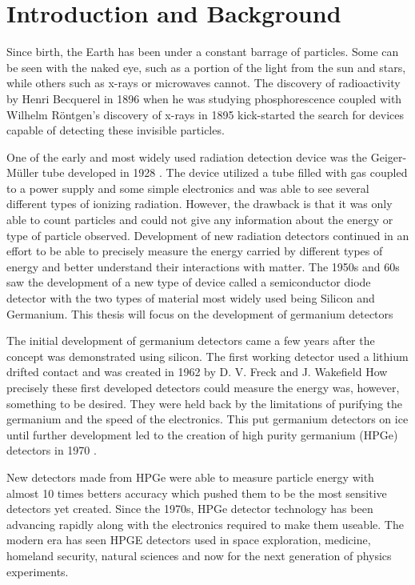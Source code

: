 \chapter{Introduction and Background}

Since birth, the Earth has been under a constant barrage of particles.
Some can be seen with the naked eye, such as a portion of the light from the sun and stars, while others such as x-rays or microwaves cannot.
The discovery of radioactivity by Henri Becquerel in 1896 when he was studying phosphorescence \cite{Mould} coupled with Wilhelm R{\"o}ntgen's discovery of x-rays in 1895 \cite{wilhelm} kick-started the search for devices capable of detecting these invisible particles.

One of the early and most widely used radiation detection device was the Geiger-M{\"u}ller tube developed in 1928 \cite{geiger}.
The device utilized a tube filled with gas coupled to a power supply and some simple electronics and was able to see several different types of ionizing radiation.
However, the drawback is that it was only able to count particles and could not give any information about the energy or type of particle observed.
Development of new radiation detectors continued in an effort to be able to precisely measure the energy carried by different types of energy and better understand their interactions with matter.
The 1950s and 60s saw the development of a new type of device called a semiconductor diode detector with the two types of material most widely used being Silicon and Germanium.
This thesis will focus on the development of germanium detectors

The initial development of germanium detectors came a few years after the concept was demonstrated using silicon.
The first working detector used a lithium drifted contact and was created in 1962 by D. V. Freck and J. Wakefield \cite{1962Natur}
How precisely these first developed detectors could measure the energy was, however, something to be desired.
They were held back by the limitations of purifying the germanium and the speed of the electronics.
This put germanium detectors on ice until further development led to the creation of high purity germanium (HPGe) detectors in 1970 \cite{Baertsch1970,Tavendale1970}.

New detectors made from HPGe were able to measure particle energy with almost 10 times betters accuracy which pushed them to be the most sensitive detectors yet created.
Since the 1970s, HPGe detector technology has been advancing rapidly along with the electronics required to make them useable.
The modern era has seen HPGE detectors used in space exploration, medicine, homeland security, natural sciences and now for the next generation of physics experiments.

